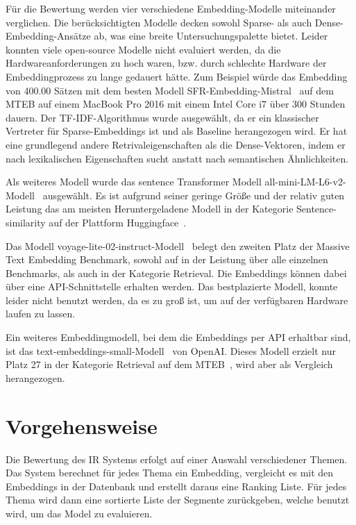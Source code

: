 Für die Bewertung werden vier verschiedene Embedding-Modelle miteinander verglichen.
Die berücksichtigten Modelle decken sowohl Sparse- als auch Dense-Embedding-Ansätze ab, was eine breite Untersuchungspalette bietet.
Leider konnten viele open-source Modelle nicht evaluiert werden, da die Hardwareanforderungen zu hoch waren, bzw. durch schlechte Hardware der Embeddingprozess zu lange gedauert hätte. 
Zum Beispiel würde das Embedding von 400.00 Sätzen mit dem besten Modell SFR-Embedding-Mistral~\cite{zotero-576} auf dem MTEB auf einem MacBook Pro 2016 mit einem Intel Core i7 über 300 Stunden dauern.
Der TF-IDF-Algorithmus wurde ausgewählt, da er ein klassischer Vertreter für Sparse-Embeddings ist und als Baseline herangezogen wird. 
Er hat eine grundlegend andere Retrivaleigenschaften als die Dense-Vektoren, indem er nach lexikalischen Eigenschaften sucht anstatt nach semantischen Ähnlichkeiten.


Als weiteres Modell wurde das sentence Transformer Modell all-mini-LM-L6-v2-Modell~\cite{minilm2024} ausgewählt.
Es ist aufgrund seiner geringe Größe und der relativ guten Leistung das am meisten Heruntergeladene Modell in der Kategorie Sentence-similarity auf der Plattform Huggingface~\cite{2024}.

Das Modell voyage-lite-02-instruct-Modell~\cite{zotero-572} belegt den zweiten Platz der Massive Text Embedding Benchmark, sowohl auf in der Leistung über alle einzelnen Benchmarks, als auch in der Kategorie Retrieval.
Die Embeddings können dabei über eine API-Schnittstelle erhalten werden.
Das bestplazierte Modell, konnte leider nicht benutzt werden, da es zu groß ist, um auf der verfügbaren Hardware laufen zu lassen.


Ein weiteres Embeddingmodell, bei dem die Embeddings per API erhaltbar sind, ist das text-embeddings-small-Modell~\cite{zotero-574} von OpenAI.
Dieses Modell erzielt nur Platz 27 in der Kategorie Retrieval auf dem MTEB~\cite{mteb}, wird aber als Vergleich herangezogen.


\section{Vorgehensweise}

Die Bewertung des IR Systems erfolgt auf einer Auswahl verschiedener Themen.
Das System berechnet für jedes Thema ein Embedding, vergleicht es mit den Embeddings in der Datenbank und erstellt daraus eine Ranking Liste.
Für jedes Thema wird dann eine sortierte Liste der Segmente zurückgeben, welche benutzt wird, um das Model zu evaluieren.

